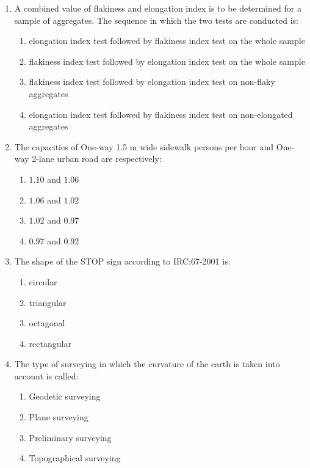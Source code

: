 \documentclass[journal]{IEEEtran}
\begin{document}
\begin{enumerate}
\item A combined value of flakiness and elongation index is to be determined for a sample of aggregates. The sequence in which the two tests are conducted is: \textbf{}

\begin{enumerate}
\item elongation index test followed by flakiness index test on the whole sample
\item flakiness index test followed by elongation index test on the whole sample
\item flakiness index test followed by elongation index test on non-flaky aggregates
\item elongation index test followed by flakiness index test on non-elongated aggregates
\end{enumerate}

\item The capacities of One-way 1.5 m wide sidewalk persons per hour and One-way 2-lane urban road  are respectively: \textbf{}
\begin{multicols}{2}
\begin{enumerate}
\item $1.10$ and $1.06$  
\item $1.06$ and $1.02$  
\item $1.02$ and $0.97$  
\item $0.97$ and $0.92$
\end{enumerate}
\end{multicols}

\item The shape of the STOP sign according to IRC:67-2001 is: \textbf{}
\begin{multicols}{2}
\begin{enumerate}
\item circular \hspace{1.2cm}
\item triangular
\item octagonal \hspace{1cm}
\item rectangular
\end{enumerate}
\end{multicols}

\item The type of surveying in which the curvature of the earth is taken into account is called: \textbf{}
\begin{multicols}{2}
\begin{enumerate}
\item Geodetic surveying \hspace{1.4cm}
\item Plane surveying
\item Preliminary surveying \hspace{1cm}
\item Topographical surveying
\end{enumerate}
\end{multicols}


\end{enumerate}
\end{document}
